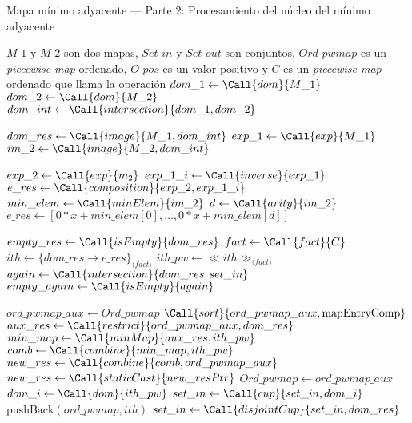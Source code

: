 \begin{algorithm}
\caption{Mapa mínimo adyacente — Parte 2: Procesamiento del núcleo del mínimo adyacente}
\label{alg:minadj-ord-proc}
\begin{algorithmic}[1]
\Require $M\_1$ y $M\_2$ son dos mapas, $Set\_in$ y $Set\_out$ son conjuntos, $Ord\_pwmap$ es un \textit{piecewise map} ordenado, $O\_pos$ es un valor positivo y $C$ es un \textit{piecewise map} ordenado que llama la operación
    \State $dom\_1 \gets \Call{dom}{M\_1}$
    \State $dom\_2 \gets \Call{dom}{M\_2}$
    \State $dom\_int \gets \Call{intersection}{dom\_1, dom\_2}$
        \State \Return
    \EndIf

    \State $dom\_res \gets \Call{image}{M\_1, dom\_int}$
    \State $exp\_1 \gets \Call{exp}{M\_1}$
    \State $im\_2 \gets \Call{image}{M\_2, dom\_int}$

        \State $exp\_2 \gets \Call{exp}{m_2}$
        \State $exp\_1\_i \gets \Call{inverse}{exp\_1}$
        \State $e\_res \gets \Call{composition}{exp\_2, exp\_1\_i}$
    \Else
        \State $min\_elem \gets \Call{minElem}{im\_2}$
        \State $d \gets \Call{arity}{im\_2}$
        \State $e\_res \gets [0*x+min\_elem[0],\dots,0*x+min\_elem[d]]$
    \EndIf

    \State $empty\_res \gets \Call{isEmpty}{dom\_res}$
        \State $fact \gets \Call{fact}{C}$
        \State $ith \gets \{dom\_res \rightarrow e\_res\}_{\langle fact \rangle}$
        \State $ith\_pw \gets \ll ith\gg_{\langle fact \rangle}$
        \State $again \gets \Call{intersection}{dom\_res, set\_in}$
        \State $empty\_again \gets \Call{isEmpty}{again}$

            \State $ord\_pwmap\_aux \gets Ord\_pwmap$
            \State $\Call{sort}{ord\_pwmap\_aux, \mathrm{mapEntryComp}}$
            \State $aux\_res \gets \Call{restrict}{ord\_pwmap\_aux, dom\_res}$
            \State $min\_map \gets \Call{minMap}{aux\_res, ith\_pw}$
            \State $comb \gets \Call{combine}{min\_map, ith\_pw}$
            \State $new\_res \gets \Call{combine}{comb, ord\_pwmap\_aux}$
            \State $new\_res \gets \Call{staticCast}{new\_resPtr}$
            \State $Ord\_pwmap \gets ord\_pwmap\_aux$
            \State $dom\_i \gets \Call{dom}{ith\_pw}$
            \State $set\_in \gets \Call{cup}{set\_in, dom\_i}$
        \Else
            \State $\mathrm{pushBack}(ord\_pwmap, ith)$
            \State $set\_in \gets \Call{disjointCup}{set\_in, dom\_res}$
        \EndIf
    \EndIf
\EndFunction
\end{algorithmic}
\end{algorithm}



